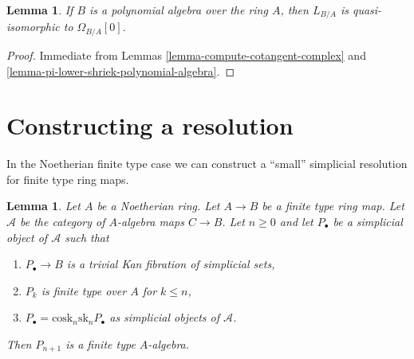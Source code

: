 \documentclass{stacks-project}
\theoremstyle{plain}
\newtheorem{lemma}[subsection]{Lemma}
\theoremstyle{definition}
\theoremstyle{remark}
\numberwithin{equation}{subsection}
\begin{document}
\begin{lemma}
\label{lemma-cotangent-complex-polynomial-algebra}
If $B$ is a polynomial algebra over the ring $A$, then
$L_{B/A}$ is quasi-isomorphic to $\Omega_{B/A}[0]$.
\end{lemma}

\begin{proof}
Immediate from
Lemmas \ref{lemma-compute-cotangent-complex} and
\ref{lemma-pi-lower-shriek-polynomial-algebra}.
\end{proof}





\section{Constructing a resolution}
\label{section-polynomial}

\noindent
In the Noetherian finite type case we can construct a ``small'' simplicial
resolution for finite type ring maps.

\begin{lemma}
\label{lemma-polynomial}
Let $A$ be a Noetherian ring. Let $A \to B$ be a finite type ring map.
Let $\mathcal{A}$ be the category of $A$-algebra maps $C \to B$. Let
$n \geq 0$ and let $P_\bullet$ be a simplicial object of $\mathcal{A}$
such that
\begin{enumerate}
\item $P_\bullet \to B$ is a trivial Kan fibration of simplicial sets,
\item $P_k$ is finite type over $A$ for $k \leq n$,
\item $P_\bullet = \text{cosk}_n \text{sk}_n P_\bullet$ as simplicial
objects of $\mathcal{A}$.
\end{enumerate}
Then $P_{n + 1}$ is a finite type $A$-algebra.
\end{lemma}
\end{document}
